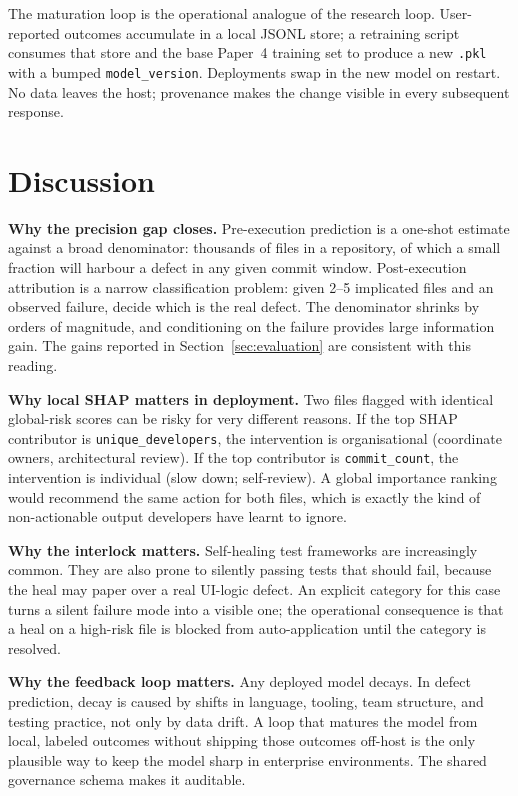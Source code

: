\documentclass[conference]{IEEEtran}
\begin{document}
The maturation loop is the operational analogue of the research loop. User-reported outcomes accumulate in a local JSONL store; a retraining script consumes that store and the base Paper~4 training set to produce a new \texttt{.pkl} with a bumped \texttt{model\_version}. Deployments swap in the new model on restart. No data leaves the host; provenance makes the change visible in every subsequent response.

\section{Discussion}
\label{sec:discussion}

\textbf{Why the precision gap closes.} Pre-execution prediction is a one-shot estimate against a broad denominator: thousands of files in a repository, of which a small fraction will harbour a defect in any given commit window. Post-execution attribution is a narrow classification problem: given 2--5 implicated files and an observed failure, decide which is the real defect. The denominator shrinks by orders of magnitude, and conditioning on the failure provides large information gain. The gains reported in Section~\ref{sec:evaluation} are consistent with this reading.

\textbf{Why local SHAP matters in deployment.} Two files flagged with identical global-risk scores can be risky for very different reasons. If the top SHAP contributor is \texttt{unique\_developers}, the intervention is organisational (coordinate owners, architectural review). If the top contributor is \texttt{commit\_count}, the intervention is individual (slow down; self-review). A global importance ranking would recommend the same action for both files, which is exactly the kind of non-actionable output developers have learnt to ignore.

\textbf{Why the interlock matters.} Self-healing test frameworks are increasingly common. They are also prone to silently passing tests that should fail, because the heal may paper over a real UI-logic defect. An explicit category for this case turns a silent failure mode into a visible one; the operational consequence is that a heal on a high-risk file is blocked from auto-application until the category is resolved.

\textbf{Why the feedback loop matters.} Any deployed model decays. In defect prediction, decay is caused by shifts in language, tooling, team structure, and testing practice, not only by data drift. A loop that matures the model from local, labeled outcomes without shipping those outcomes off-host is the only plausible way to keep the model sharp in enterprise environments. The shared governance schema makes it auditable.
\end{document}
